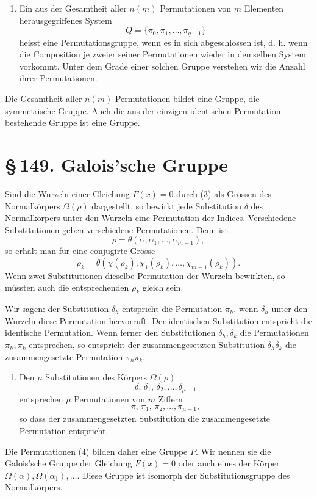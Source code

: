 \documentclass[11pt]{article}
\providecommand{\sect}[2]{\section*{\S\,#1. #2}}
\begin{document}
\begin{enumerate}[label=\arabic*.,leftmargin=2em,start=3]
\item Ein aus der Gesamtheit aller $n(m)$ Permutationen von $m$ Elementen herausgegriffenes System
\[
        Q=\{\pi_0,\pi_1,\ldots,\pi_{q-1}\}
\]
heisst eine Permutationsgruppe, wenn es in sich abgeschlossen ist, d. h. wenn die Composition je zweier seiner Permutationen wieder in demselben System vorkommt. Unter dem Grade einer solchen Gruppe verstehen wir die Anzahl ihrer Permutationen.
\end{enumerate}

Die Gesamtheit aller $n(m)$ Permutationen bildet eine Gruppe, die symmetrische Gruppe. Auch die aus der einzigen identischen Permutation bestehende Gruppe ist eine Gruppe.

\sect{149}{Galois'sche Gruppe}

Sind die Wurzeln einer Gleichung $F(x)=0$ durch (3) als Grössen des Normalkörpers $\Omega(\rho)$ dargestellt, so bewirkt jede Substitution $\delta$ des Normalkörpers unter den Wurzeln eine Permutation der Indices. Verschiedene Substitutionen geben verschiedene Permutationen. Denn ist
\[
        \rho=\theta(\alpha,\alpha_1,\ldots,\alpha_{m-1}),
\tag{1}
\]
so erhält man für eine conjugirte Grösse
\[
        \rho_k=\theta(\chi(\rho_k),\chi_1(\rho_k),\ldots,\chi_{m-1}(\rho_k)).
\tag{2}
\]
Wenn zwei Substitutionen dieselbe Permutation der Wurzeln bewirkten, so müssten auch die entsprechenden $\rho_k$ gleich sein.

Wir sagen: der Substitution $\delta_h$ entspricht die Permutation $\pi_h$, wenn $\delta_h$ unter den Wurzeln diese Permutation hervorruft. Der identischen Substitution entspricht die identische Permutation. Wenn ferner den Substitutionen $\delta_h,\delta_k$ die Permutationen $\pi_h,\pi_k$ entsprechen, so entspricht der zusammengesetzten Substitution $\delta_h\delta_k$ die zusammengesetzte Permutation $\pi_h\pi_k$.

\begin{enumerate}[label=\arabic*.,leftmargin=2em]
\item Den $\mu$ Substitutionen des Körpers $\Omega(\rho)$
\[
        \delta,\,\delta_1,\,\delta_2,\ldots,\delta_{
\mu-1}
\tag{3}
\]
entsprechen $\mu$ Permutationen von $m$ Ziffern
\[
        \pi,\,\pi_1,\,\pi_2,\ldots,\pi_{
\mu-1},
\tag{4}
\]
so dass der zusammengesetzten Substitution die zusammengesetzte Permutation entspricht.
\end{enumerate}

Die Permutationen (4) bilden daher eine Gruppe $P$. Wir nennen sie die Galois'sche Gruppe der Gleichung $F(x)=0$ oder auch eines der Körper $\Omega(\alpha),\Omega(\alpha_1),\ldots$. Diese Gruppe ist isomorph der Substitutionsgruppe des Normalkörpers.
\end{document}
